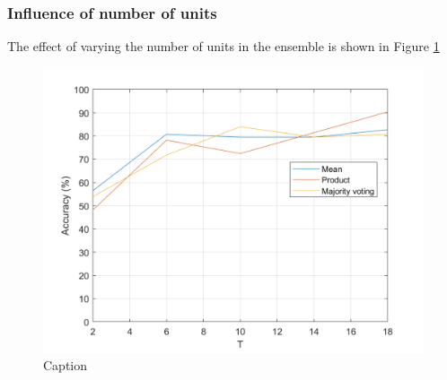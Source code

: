 \documentclass[10pt,technote]{IEEEtran}
\begin{document}
\subsubsection{Influence of number of units}
The effect of varying the number of units in the ensemble is shown in Figure \ref{fig:acc_vs_n_units}

\begin{figure}
    \centering
    \includegraphics{../results/ex2LDAEnsemble/acc_vs_n_unit.png}
    \caption{Caption}
    \label{fig:acc_vs_n_units}
\end{figure}



%
%
\end{document}
